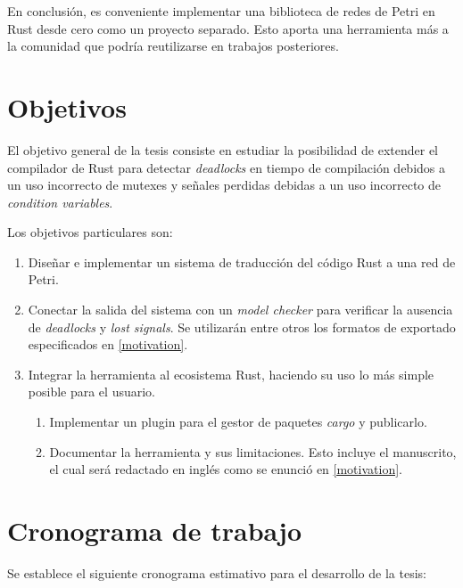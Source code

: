 \documentclass[12pt]{article}
\begin{document}
En conclusión, es conveniente implementar una biblioteca de redes de Petri en Rust desde cero como un proyecto separado.
Esto aporta una herramienta más a la comunidad que podría reutilizarse en trabajos posteriores.

\bigskip

\section{Objetivos}

El objetivo general de la tesis consiste en estudiar la posibilidad de extender el compilador de Rust
para detectar \textit{deadlocks} en tiempo de compilación debidos a un uso incorrecto de mutexes
y señales perdidas debidas a un uso incorrecto de \textit{condition variables}.

Los objetivos particulares son:

\begin{enumerate}
    \item Diseñar e implementar un sistema de traducción del código Rust a una red de Petri.
    \item Conectar la salida del sistema con un \textit{model checker} para verificar la ausencia de \textit{deadlocks} y \textit{lost signals}.
          Se utilizarán entre otros los formatos de exportado especificados en \ref{motivation}.
    \item Integrar la herramienta al ecosistema Rust, haciendo su uso lo más simple posible para el usuario.
          \begin{enumerate}
              \item Implementar un plugin para el gestor de paquetes \textit{cargo} y publicarlo.
              \item Documentar la herramienta y sus limitaciones.
                    Esto incluye el manuscrito, el cual será redactado en inglés como se enunció en \ref{motivation}.
          \end{enumerate}
\end{enumerate}

\bigskip

\section{Cronograma de trabajo}

Se establece el siguiente cronograma estimativo para el desarrollo de la tesis:

\bigskip
\end{document}
